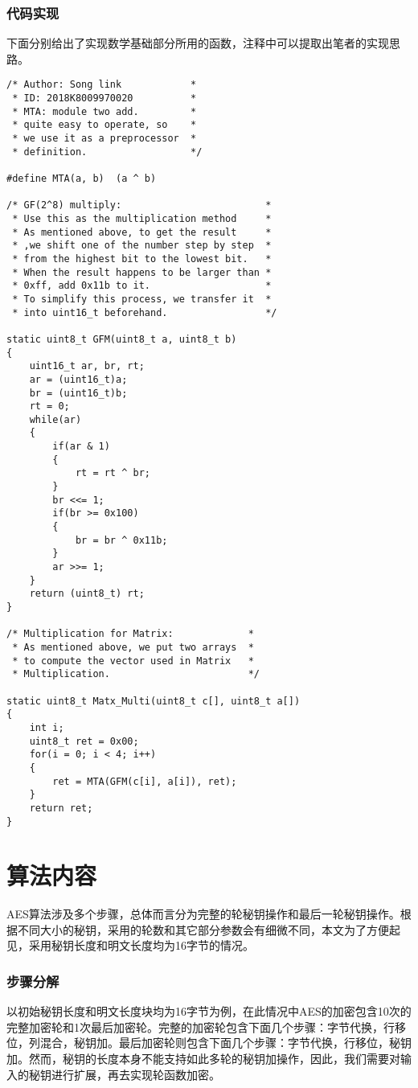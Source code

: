 \documentclass[UTF8]{ctexart}
\begin{document}
\section{代码实现}
下面分别给出了实现数学基础部分所用的函数，注释中可以提取出笔者的实现思路。
\lstset{language = C}
\begin{lstlisting}
/* Author: Song link            *
 * ID: 2018K8009970020          *
 * MTA: module two add.         *
 * quite easy to operate, so    *
 * we use it as a preprocessor  *
 * definition.                  */ 

#define MTA(a, b)  (a ^ b)

/* GF(2^8) multiply:                         *
 * Use this as the multiplication method     *
 * As mentioned above, to get the result     *
 * ,we shift one of the number step by step  *
 * from the highest bit to the lowest bit.   *
 * When the result happens to be larger than *
 * 0xff, add 0x11b to it.                    *
 * To simplify this process, we transfer it  *
 * into uint16_t beforehand.                 */

static uint8_t GFM(uint8_t a, uint8_t b)
{
	uint16_t ar, br, rt;
	ar = (uint16_t)a;
	br = (uint16_t)b;
	rt = 0;
	while(ar)
	{
		if(ar & 1)
		{
			rt = rt ^ br;
		}
		br <<= 1;
		if(br >= 0x100)
		{
			br = br ^ 0x11b;
		}
		ar >>= 1;
	}
	return (uint8_t) rt;
}

/* Multiplication for Matrix:             *
 * As mentioned above, we put two arrays  *
 * to compute the vector used in Matrix   *
 * Multiplication.                        */

static uint8_t Matx_Multi(uint8_t c[], uint8_t a[])
{
	int i;
	uint8_t ret = 0x00;
	for(i = 0; i < 4; i++)
	{
		ret = MTA(GFM(c[i], a[i]), ret);
	}
	return ret;
}
\end{lstlisting}
\part{算法内容}
AES算法涉及多个步骤，总体而言分为完整的轮秘钥操作和最后一轮秘钥操作。根据不同大小的秘钥，采用的轮数和其它部分参数会有细微不同，本文为了方便起见，采用秘钥长度和明文长度均为16字节的情况。
\section{步骤分解}
以初始秘钥长度和明文长度块均为16字节为例，在此情况中AES的加密包含10次的完整加密轮和1次最后加密轮。完整的加密轮包含下面几个步骤：字节代换，行移位，列混合，秘钥加。最后加密轮则包含下面几个步骤：字节代换，行移位，秘钥加。然而，秘钥的长度本身不能支持如此多轮的秘钥加操作，因此，我们需要对输入的秘钥进行扩展，再去实现轮函数加密。
\end{document}
